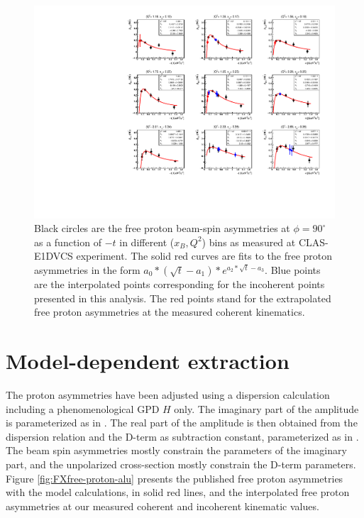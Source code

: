 \begin{figure}[tpb]
\centering
\includegraphics[scale=0.85]{fig_Dec2016/F_ALU-proton-fits.pdf}
\caption{Black circles are the free proton beam-spin asymmetries at $\phi = 90 
   ^{\circ}$ as a function of $-t$ in different ($x_B, Q^2$) bins as measured 
   at CLAS-E1DVCS experiment. The solid red curves are fits to the free proton 
   asymmetries in the form $a_{0}*(\sqrt{t}-a_{1})*e^{a_{2}*\sqrt{t} - a_{3}}$.
   Blue points are the interpolated points corresponding for the incoherent 
points presented in this analysis. The red points stand for the extrapolated 
free proton asymmetries at the measured coherent kinematics.}
\label{fig:free-proton-alu}
\end{figure}


\section{Model-dependent extraction} \label{model_int}
The proton asymmetries have been adjusted using a dispersion calculation 
including a phenomenological GPD $H$ only. The imaginary part of the amplitude 
is parameterized as in \cite{GPD_cal_free_p}. The real part of the amplitude is 
then obtained from the dispersion relation and the D-term as subtraction 
constant, parameterized as in \cite{GPD_cal_free_p}. The beam spin asymmetries 
mostly constrain the parameters of the imaginary part, and the unpolarized 
cross-section mostly constrain the D-term parameters. Figure 
\ref{fig:FXfree-proton-alu} presents the published free proton asymmetries with 
the model calculations, in solid red lines, and the interpolated free proton 
asymmetries at our measured coherent and incoherent kinematic values.

